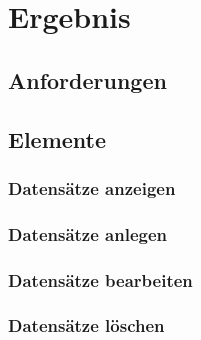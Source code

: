 \chapter{Ergebnis}

\section{Anforderungen}

\section{Elemente}

\subsection{Datensätze anzeigen}

\subsection{Datensätze anlegen}

\subsection{Datensätze bearbeiten}

\subsection{Datensätze löschen}

